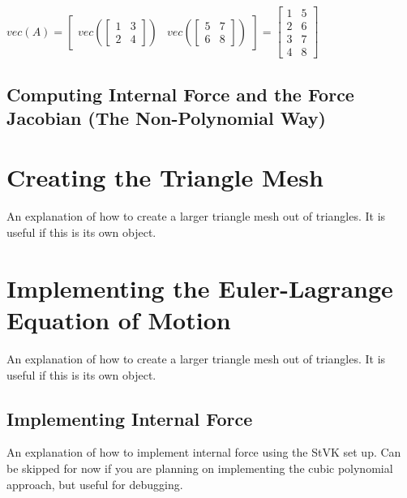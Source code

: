 \documentclass[twocolumn,10pt]{asme2ej}
\begin{document}
\begin{center}
$vec(A) = \begin{bmatrix} vec(\begin{bmatrix} 1 & 3 \\ 2 & 4 \end{bmatrix}) & vec(\begin{bmatrix} 5 & 7 \\ 6 & 8 \end{bmatrix}) \end{bmatrix} = \begin{bmatrix} 1 & 5 \\ 2 & 6 \\ 3 & 7 \\ 4 & 8 \end{bmatrix}$
\end{center}

\subsection{Computing Internal Force and the Force Jacobian (The Non-Polynomial Way)}


\section{Creating the Triangle Mesh}

An explanation of how to create a larger triangle mesh out of triangles. It is useful if this is its own
object.

\section{Implementing the Euler-Lagrange Equation of Motion}

An explanation of how to create a larger triangle mesh out of triangles. It is useful if this is its own
object.

\subsection{Implementing Internal Force}

An explanation of how to implement internal force using the StVK set up. Can be skipped for now if you are
planning on implementing the cubic polynomial approach, but useful for debugging.
\end{document}
